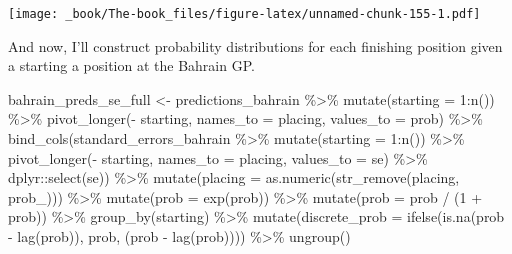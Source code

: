\documentclass[
]{book}
\newenvironment{Shaded}{\begin{snugshade}}{\end{snugshade}}
\newcommand{\AttributeTok}[1]{\textcolor[rgb]{0.77,0.63,0.00}{#1}}
\newcommand{\DecValTok}[1]{\textcolor[rgb]{0.00,0.00,0.81}{#1}}
\newcommand{\FunctionTok}[1]{\textcolor[rgb]{0.00,0.00,0.00}{#1}}
\newcommand{\NormalTok}[1]{#1}
\newcommand{\OtherTok}[1]{\textcolor[rgb]{0.56,0.35,0.01}{#1}}
\newcommand{\SpecialCharTok}[1]{\textcolor[rgb]{0.00,0.00,0.00}{#1}}
\newcommand{\StringTok}[1]{\textcolor[rgb]{0.31,0.60,0.02}{#1}}
\begin{document}
\texttt{[image: \_book/The-book\_files/figure-latex/unnamed-chunk-155-1.pdf]}

And now, I'll construct probability distributions for each finishing position given a starting a position at the Bahrain GP.

\begin{Shaded}
\begin{Highlighting}[]
\NormalTok{bahrain\_preds\_se\_full }\OtherTok{\textless{}{-}}\NormalTok{ predictions\_bahrain }\SpecialCharTok{\%\textgreater{}\%}
  \FunctionTok{mutate}\NormalTok{(}\AttributeTok{starting =} \DecValTok{1}\SpecialCharTok{:}\FunctionTok{n}\NormalTok{()) }\SpecialCharTok{\%\textgreater{}\%}
  \FunctionTok{pivot\_longer}\NormalTok{(}\SpecialCharTok{{-}}\NormalTok{ starting, }\AttributeTok{names\_to =} \StringTok{\textquotesingle{}placing\textquotesingle{}}\NormalTok{, }\AttributeTok{values\_to =} \StringTok{\textquotesingle{}prob\textquotesingle{}}\NormalTok{) }\SpecialCharTok{\%\textgreater{}\%} 
  \FunctionTok{bind\_cols}\NormalTok{(standard\_errors\_bahrain }\SpecialCharTok{\%\textgreater{}\%} \FunctionTok{mutate}\NormalTok{(}\AttributeTok{starting =} \DecValTok{1}\SpecialCharTok{:}\FunctionTok{n}\NormalTok{()) }\SpecialCharTok{\%\textgreater{}\%}
  \FunctionTok{pivot\_longer}\NormalTok{(}\SpecialCharTok{{-}}\NormalTok{ starting, }\AttributeTok{names\_to =} \StringTok{\textquotesingle{}placing\textquotesingle{}}\NormalTok{, }\AttributeTok{values\_to =} \StringTok{\textquotesingle{}se\textquotesingle{}}\NormalTok{) }\SpecialCharTok{\%\textgreater{}\%}
\NormalTok{    dplyr}\SpecialCharTok{::}\FunctionTok{select}\NormalTok{(se)) }\SpecialCharTok{\%\textgreater{}\%}
  \FunctionTok{mutate}\NormalTok{(}\AttributeTok{placing =} \FunctionTok{as.numeric}\NormalTok{(}\FunctionTok{str\_remove}\NormalTok{(placing, }\StringTok{\textquotesingle{}prob\_\textquotesingle{}}\NormalTok{))) }\SpecialCharTok{\%\textgreater{}\%}
  \FunctionTok{mutate}\NormalTok{(}\AttributeTok{prob =} \FunctionTok{exp}\NormalTok{(prob)) }\SpecialCharTok{\%\textgreater{}\%}
  \FunctionTok{mutate}\NormalTok{(}\AttributeTok{prob =}\NormalTok{ prob }\SpecialCharTok{/}\NormalTok{ (}\DecValTok{1} \SpecialCharTok{+}\NormalTok{ prob)) }\SpecialCharTok{\%\textgreater{}\%}
  \FunctionTok{group\_by}\NormalTok{(starting) }\SpecialCharTok{\%\textgreater{}\%} 
  \FunctionTok{mutate}\NormalTok{(}\AttributeTok{discrete\_prob =} \FunctionTok{ifelse}\NormalTok{(}\FunctionTok{is.na}\NormalTok{(prob }\SpecialCharTok{{-}} \FunctionTok{lag}\NormalTok{(prob)), prob, (prob }\SpecialCharTok{{-}} \FunctionTok{lag}\NormalTok{(prob)))) }\SpecialCharTok{\%\textgreater{}\%}
  \FunctionTok{ungroup}\NormalTok{()}


\end{Highlighting}
\end{Shaded}
\end{document}
